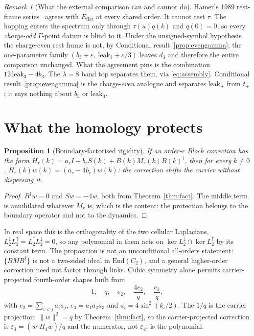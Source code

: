 \documentclass[11pt]{article}
\theoremstyle{plain}
\newtheorem{proposition}[theorem]{Proposition}
\theoremstyle{definition}
\theoremstyle{remark}
\newtheorem{remark}[theorem]{Remark}
\newcommand{\chk}[1]{}
\newcommand{\dg}{^{\dagger}}
\begin{document}
\begin{remark}[What the external comparison can and cannot do]
Hamer's 1989 rest-frame series~\cite{Hamer1989} agrees with $E_{\mathrm{flat}}$
at every shared order. It cannot test $\tau$. The hopping enters the spectrum
only through $\tau(u)q(k)$ and $q(0)=0$, so every \emph{charge-odd}
$\Gamma$-point datum is blind to it. Under the unsigned-symbol hypothesis the
charge-even rest frame is not, by Conditional result~\ref{prop:evengamma}; the one-parameter family
$(b_3+\varepsilon,\ \mathrm{leak}_3+\varepsilon/3)$ leaves $d_3$ and therefore
the entire comparison unchanged. What the agreement pins is the combination
$12\,\mathrm{leak}_3-4b_3$. The $\lambda=8$ band top separates them, via \eqref{eq:assembly}.
Conditional result~\ref{prop:evengamma} is the charge-\emph{even} analogue and
separates $\mathrm{leak}_+$ from $t_+$; it says nothing about $b_3$ or
$\mathrm{leak}_3$.
\chk{FINDING: no Gamma-point datum can constrain the hopping}
\end{remark}

\section{What the homology protects}

\begin{proposition}[Boundary-factorised rigidity]\label{prop:rigid}
If an order-$r$ Bloch correction has the form
$H_r(k)=a_rI+b_rS(k)+B(k)M_r(k)B(k)\dg$, then for every $k\neq0$,
$H_r(k)w(k)=(a_r-4b_r)w(k)$: the correction shifts the carrier without
dispersing it.
\end{proposition}

\begin{proof}
$B\dg w=0$ and $Sw=-4w$, both from Theorem~\ref{thm:fact}. The middle term is
annihilated whatever $M_r$ is, which is the content: the protection belongs to
the boundary operator and not to the dynamics.
\end{proof}
\chk{a boundary-factorised correction shifts the carrier without dispersing it, for generic M}

In real space this is the orthogonality of the two cellular Laplacians,
$L^{\downarrow}_2L^{\uparrow}_2=L^{\uparrow}_2L^{\downarrow}_2=0$, so any
polynomial in them acts on $\ker L^{\downarrow}_2\cap\ker L^{\uparrow}_2$ by
its constant term. The proposition is not an unconditional all-orders
statement: $\{BMB\dg\}$ is not a two-sided ideal in $\mathrm{End}(C_2)$, and a
general higher-order correction need not factor through links. Cubic symmetry
alone permits carrier-projected fourth-order shapes built from
\begin{equation}\label{eq:shapes}
  1,\quad q,\quad e_2,\quad \frac{4e_2}{q},\quad \frac{e_3}{q},
\end{equation}
with $e_2=\sum_{i<j}a_ia_j$, $e_3=a_1a_2a_3$ and $a_i=4\sin^2(k_i/2)$. The
$1/q$ is the carrier projection: $\|w\|^2=q$ by Theorem~\ref{thm:fact}, so the
carrier-projected correction is $\varepsilon_4=(w\dg H_4w)/q$ and the
numerator, not $\varepsilon_4$, is the polynomial.
\chk{the carrier projection is where the 1/q comes from}
\chk{clearing the denominator reproduces the five-element numerator basis}
\end{document}
